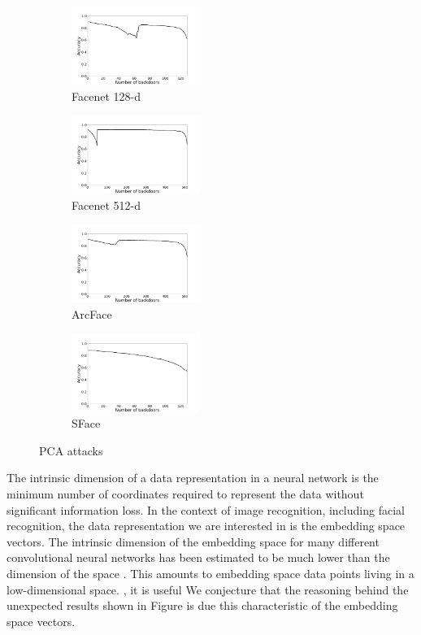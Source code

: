 \documentclass{article}
\theoremstyle{plain}
\theoremstyle{definition}
\theoremstyle{remark}
\begin{document}
\begin{figure}[t!]
    \centering
    \begin{subfigure}[t]{0.23\textwidth}
        \centering
        \includegraphics[height=1.0in]{figures/pca_attack_Facenet_opencv_cosine_all.png}
        \caption{Facenet 128-d}
    \end{subfigure}%
    \hfill 
    \begin{subfigure}[t]{0.23\textwidth}
        \centering
        \includegraphics[height=1.0in]{figures/pca_attack_Facenet512_opencv_cosine_all.png}
        \caption{Facenet 512-d}
    \end{subfigure}
    \hfill 
    \begin{subfigure}[t]{0.23\textwidth}
        \centering
        \includegraphics[height=1.0in]{figures/pca_attack_ArcFace_opencv_cosine_all.png}
        \caption{ArcFace}
    \end{subfigure}
    \hfill 
    \begin{subfigure}[t]{0.23\linewidth}
        \centering
        \includegraphics[height=1.0in]{figures/pca_attack_SFace_opencv_cosine_all.png}
        \caption{SFace}
    \end{subfigure}
    \caption{PCA attacks}
\end{figure}
The intrinsic dimension of a data representation in a neural network is the minimum number of coordinates required to represent the data without significant information loss. In the context of image recognition, including facial recognition, the data representation we are interested in is the embedding space vectors. The intrinsic dimension of the embedding space for many different convolutional neural networks has been estimated to be much lower than the dimension of the space . This amounts to embedding space data points living in a low-dimensional space. , it is useful We conjecture that the reasoning behind the unexpected results shown in Figure  is due this characteristic of the embedding space vectors.
\end{document}
